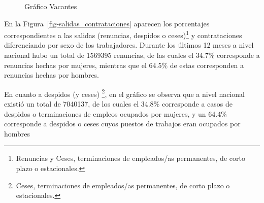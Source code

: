 \documentclass[
  11pt,
]{article}
\begin{document}
\begin{figure}[H]

\caption{\label{fig-vacantes}Gráfico Vacantes}


\end{figure}%

En la Figura~\ref{fig-salidas_contrataciones} aparecen los porcentajes
correspondientes a las salidas (renuncias, despidos o ceses)\footnote{Renuncias
  y Ceses, terminaciones de empleados/as permanentes, de corto plazo o
  estacionales.} y contrataciones diferenciando por sexo de los
trabajadores. Durante los últimos 12 meses a nivel nacional hubo un
total de 1569395 renuncias, de las cuales el 34.7\% corresponde a
renuncias hechas por mujeres, mientras que el 64.5\% de estas
corresponden a renuncias hechas por hombres.

En cuanto a despidos (y ceses) \footnote{Ceses, terminaciones de
  empleados/as permanentes, de corto plazo o estacionales.}, en el
gráfico se observa que a nivel nacional existió un total de 7040137, de
los cuales el 34.8\% corresponde a casos de despidos o terminaciones de
empleos ocupados por mujeres, y un 64.4\% corresponde a despidos o ceses
cuyos puestos de trabajos eran ocupados por hombres

\FloatBarrier
\end{document}
